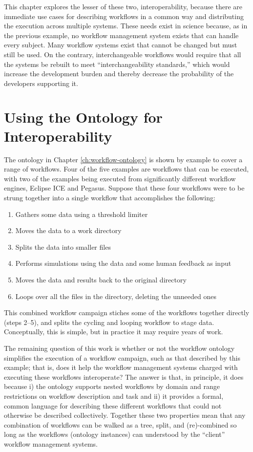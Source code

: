This chapter explores the lesser of these two, interoperability, because there
are immediate use cases for describing workflows in a common way and
distributing the execution across multiple systems. These needs exist in
science because, as in the previous example, no workflow management system
exists that can handle every subject. Many workflow systems exist that cannot be
changed but must still be used. On the contrary, interchangeable workflows
would require that all the systems be rebuilt to meet ``interchangeability
standards,'' which would increase the development burden and thereby decrease
the probability of the developers supporting it.

\section{Using the Ontology for Interoperability}

The ontology in Chapter \ref{ch:workflow-ontology} is shown by example to cover
a range of workflows. Four of the five examples are workflows that can be
executed, with two of the examples being executed from significantly different
workflow engines, Eclipse ICE and Pegasus. Suppose that these four workflows
were to be strung together into a single workflow that accomplishes the
following:
\begin{enumerate}
  \item Gathers some data using a threshold limiter
  \item Moves the data to a work directory
  \item Splits the data into smaller files
  \item Performs simulations using the data and some human feedback as input
  \item Moves the data and results back to the original directory
  \item Loops over all the files in the directory, deleting the unneeded ones
\end{enumerate}
This combined workflow campaign stiches some of the workflows together directly
(steps 2--5), and splits the cycling and looping workflow to stage data.
Conceptually, this is simple, but in practice it may require years of work.

The remaining question of this work is whether or not the workflow ontology
simplifies the execution of a workflow campaign, such as that described by
this example; that is, does it help the workflow management systems charged with
executing these workflows interoperate? The answer is that, in principle, it
does because i) the ontology supports nested workflows by domain and range
restrictions on workflow description and task and ii) it provides a formal,
common language for describing these different workflows that could not
otherwise be described collectively. Together these two properties mean that
any combination of workflows can be walked as a tree, split, and (re)-combined
so long as the workflows (ontology instances) can understood by the ``client''
workflow management systems.

